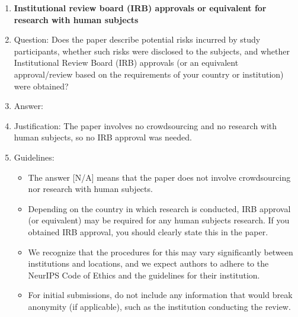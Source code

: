 \begin{enumerate}
\item {\bf Institutional review board (IRB) approvals or equivalent for research with human subjects}
    \item[] Question: Does the paper describe potential risks incurred by study participants, whether such risks were disclosed to the subjects, and whether Institutional Review Board (IRB) approvals (or an equivalent approval/review based on the requirements of your country or institution) were obtained?
    \item[] Answer: \answerNA{}
    \item[] Justification: The paper involves no crowdsourcing and no research with human subjects, so no IRB approval was needed.
    \item[] Guidelines:
    \begin{itemize}
        \item The answer [N/A] means that the paper does not involve crowdsourcing nor research with human subjects.
        \item Depending on the country in which research is conducted, IRB approval (or equivalent) may be required for any human subjects research. If you obtained IRB approval, you should clearly state this in the paper.
        \item We recognize that the procedures for this may vary significantly between institutions and locations, and we expect authors to adhere to the NeurIPS Code of Ethics and the guidelines for their institution.
        \item For initial submissions, do not include any information that would break anonymity (if applicable), such as the institution conducting the review.
    \end{itemize}


\end{enumerate}
